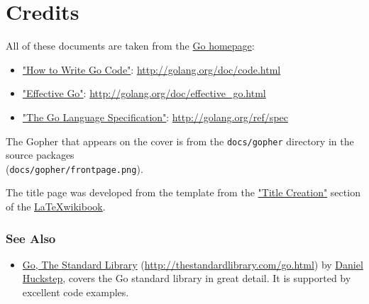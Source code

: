 \cleardoublepage
{}
{}

\chapter*{Credits}

All of these documents are taken from the \href{http://golang.org}{Go homepage}:

\begin{itemize}
  \item \href{http://golang.org/doc/code.html}{"How to Write Go Code"}:
  \url{http://golang.org/doc/code.html}
  \item \href{http://golang.org/doc/effective_go.html}{"Effective Go"}:
  \url{http://golang.org/doc/effective_go.html}
  \item \href{http://golang.org/ref/spec}{"The Go Language Specification"}:
  \url{http://golang.org/ref/spec}
\end{itemize}

The Gopher that appears on the cover is from the \verb|docs/gopher| directory
in the source packages\\
(\verb|docs/gopher/frontpage.png|).

The title page was developed from the template from the
\href{https://en.wikibooks.org/wiki/LaTeX/Title_Creation}{"Title Creation"}
section of the \href{https://en.wikibooks.org/wiki/LaTeX}{\LaTeX wikibook}.

\subsection*{See Also}
\begin{itemize}
  \item \href{http://thestandardlibrary.com/go.html}{Go, The Standard Library}
  (\url{http://thestandardlibrary.com/go.html}) by
  \href{http://verboselogging.com/}{Daniel Huckstep}, covers the Go standard
  library in great detail. It is supported by excellent code examples.
\end{itemize}

